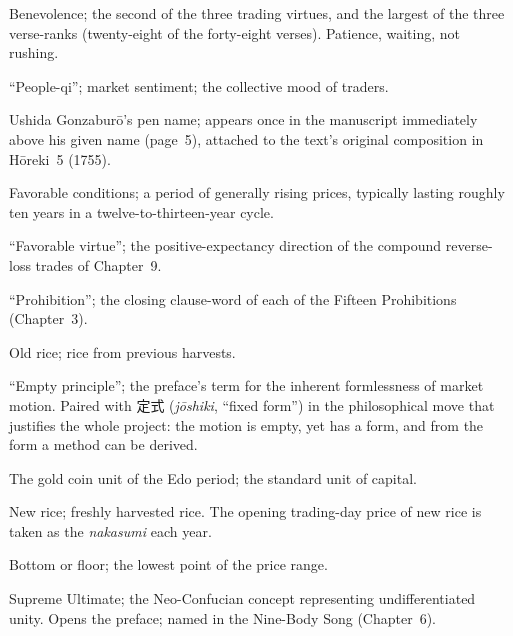 \documentclass[10pt, openany]{book}
\newcommand{\jp}[1]{{\japanesefont #1}}
\begin{document}
\begin{description}[style=nextline, leftmargin=2em, font=\normalfont\bfseries]
\item[\jp{仁} (\textit{jin})]
Benevolence; the second of the three trading virtues, and the
largest of the three verse-ranks (twenty-eight of the forty-eight
verses). Patience, waiting, not rushing.

\item[\jp{人気} (\textit{jinki})]
``People-qi''; market sentiment; the collective mood of traders.

\item[\jp{慈雲斎} (\textit{Jiunsai})]
Ushida Gonzabur\=o's pen name; appears once in the manuscript
immediately above his given name (page~5), attached to the text's
original composition in H\=oreki~5 (1755).

\item[\jp{順来} (\textit{junrai})]
Favorable conditions; a period of generally rising prices,
typically lasting roughly ten years in a twelve-to-thirteen-year
cycle.

\item[\jp{順徳} (\textit{juntoku})]
``Favorable virtue''; the positive-expectancy direction of the
compound reverse-loss trades of Chapter~9.

\item[\jp{禁制} (\textit{kinsei})]
``Prohibition''; the closing clause-word of each of the Fifteen
Prohibitions (Chapter~3).

\item[\jp{古米} (\textit{komai})]
Old rice; rice from previous harvests.

\item[\jp{空理} (\textit{k\=uri})]
``Empty principle''; the preface's term for the inherent
formlessness of market motion. Paired with \jp{定式}
(\textit{j\=oshiki}, ``fixed form'') in the philosophical move that
justifies the whole project: the motion is empty, yet has a form,
and from the form a method can be derived.

\item[\jp{両} (\textit{ry\=o})]
The gold coin unit of the Edo period; the standard unit of capital.

\item[\jp{新米} (\textit{shinmai})]
New rice; freshly harvested rice. The opening trading-day price of
new rice is taken as the \textit{nakasumi} each year.

\item[\jp{底} (\textit{soko})]
Bottom or floor; the lowest point of the price range.

\item[\jp{太極} (\textit{taikyoku})]
Supreme Ultimate; the Neo-Confucian concept representing
undifferentiated unity. Opens the preface; named in the Nine-Body
Song (Chapter~6).


\end{description}
\end{document}
